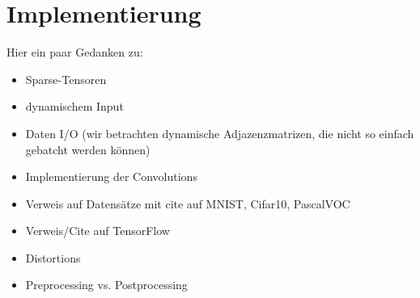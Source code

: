 \chapter{Implementierung}

Hier ein paar Gedanken zu:

\begin{itemize}
  \item Sparse-Tensoren
  \item dynamischem Input
  \item Daten I/O (wir betrachten dynamische Adjazenzmatrizen, die nicht so einfach gebatcht werden können)
  \item Implementierung der Convolutions
  \item Verweis auf Datensätze mit cite auf MNIST, Cifar10, PascalVOC
  \item Verweis/Cite auf TensorFlow
  \item Distortions
  \item Preprocessing vs. Postprocessing
\end{itemize}


